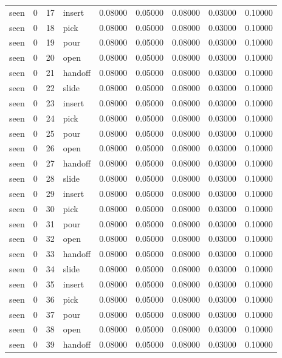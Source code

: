 \documentclass{article}
\begin{document}
\begin{center}
\begin{longtable}{lllllllll}
seen & 0 & 17 & insert & 0.08000 & 0.05000 & 0.08000 & 0.03000 & 0.10000 \\
seen & 0 & 18 & pick & 0.08000 & 0.05000 & 0.08000 & 0.03000 & 0.10000 \\
seen & 0 & 19 & pour & 0.08000 & 0.05000 & 0.08000 & 0.03000 & 0.10000 \\
seen & 0 & 20 & open & 0.08000 & 0.05000 & 0.08000 & 0.03000 & 0.10000 \\
seen & 0 & 21 & handoff & 0.08000 & 0.05000 & 0.08000 & 0.03000 & 0.10000 \\
seen & 0 & 22 & slide & 0.08000 & 0.05000 & 0.08000 & 0.03000 & 0.10000 \\
seen & 0 & 23 & insert & 0.08000 & 0.05000 & 0.08000 & 0.03000 & 0.10000 \\
seen & 0 & 24 & pick & 0.08000 & 0.05000 & 0.08000 & 0.03000 & 0.10000 \\
seen & 0 & 25 & pour & 0.08000 & 0.05000 & 0.08000 & 0.03000 & 0.10000 \\
seen & 0 & 26 & open & 0.08000 & 0.05000 & 0.08000 & 0.03000 & 0.10000 \\
seen & 0 & 27 & handoff & 0.08000 & 0.05000 & 0.08000 & 0.03000 & 0.10000 \\
seen & 0 & 28 & slide & 0.08000 & 0.05000 & 0.08000 & 0.03000 & 0.10000 \\
seen & 0 & 29 & insert & 0.08000 & 0.05000 & 0.08000 & 0.03000 & 0.10000 \\
seen & 0 & 30 & pick & 0.08000 & 0.05000 & 0.08000 & 0.03000 & 0.10000 \\
seen & 0 & 31 & pour & 0.08000 & 0.05000 & 0.08000 & 0.03000 & 0.10000 \\
seen & 0 & 32 & open & 0.08000 & 0.05000 & 0.08000 & 0.03000 & 0.10000 \\
seen & 0 & 33 & handoff & 0.08000 & 0.05000 & 0.08000 & 0.03000 & 0.10000 \\
seen & 0 & 34 & slide & 0.08000 & 0.05000 & 0.08000 & 0.03000 & 0.10000 \\
seen & 0 & 35 & insert & 0.08000 & 0.05000 & 0.08000 & 0.03000 & 0.10000 \\
seen & 0 & 36 & pick & 0.08000 & 0.05000 & 0.08000 & 0.03000 & 0.10000 \\
seen & 0 & 37 & pour & 0.08000 & 0.05000 & 0.08000 & 0.03000 & 0.10000 \\
seen & 0 & 38 & open & 0.08000 & 0.05000 & 0.08000 & 0.03000 & 0.10000 \\
seen & 0 & 39 & handoff & 0.08000 & 0.05000 & 0.08000 & 0.03000 & 0.10000 \\

\end{longtable}
\end{center}
\end{document}
